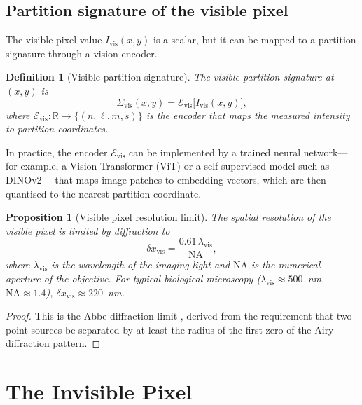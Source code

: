 \documentclass[11pt,twocolumn,a4paper]{article}
\newtheorem{proposition}[theorem]{Proposition}
\newtheorem{definition}{Definition}
\newcommand{\Sigvis}{\Sigma_{\mathrm{vis}}}
\newcommand{\R}{\mathbb{R}}
\begin{document}
\subsection{Partition signature of the visible pixel}

The visible pixel value $I_{\mathrm{vis}}(x,y)$ is a scalar, but it can be mapped to a partition signature through a vision encoder.

\begin{definition}[Visible partition signature]\label{def:vissig}
The visible partition signature at $(x,y)$ is
\begin{equation}\label{eq:vissig}
\Sigvis(x,y) = \mathcal{E}_{\mathrm{vis}}\bigl[I_{\mathrm{vis}}(x,y)\bigr],
\end{equation}
where $\mathcal{E}_{\mathrm{vis}}: \R \to \{(n,\ell,m,s)\}$ is the encoder that maps the measured intensity to partition coordinates.
\end{definition}

In practice, the encoder $\mathcal{E}_{\mathrm{vis}}$ can be implemented by a trained neural network---for example, a Vision Transformer (ViT) \citep{Dosovitskiy2021} or a self-supervised model such as DINOv2 \citep{Oquab2024}---that maps image patches to embedding vectors, which are then quantised to the nearest partition coordinate.

\begin{proposition}[Visible pixel resolution limit]\label{prop:vis_resolution}
The spatial resolution of the visible pixel is limited by diffraction to
\begin{equation}\label{eq:diffraction}
\delta x_{\mathrm{vis}} = \frac{0.61\,\lambda_{\mathrm{vis}}}{\mathrm{NA}},
\end{equation}
where $\lambda_{\mathrm{vis}}$ is the wavelength of the imaging light and $\mathrm{NA}$ is the numerical aperture of the objective.
For typical biological microscopy ($\lambda_{\mathrm{vis}} \approx 500$~nm, $\mathrm{NA} \approx 1.4$), $\delta x_{\mathrm{vis}} \approx 220$~nm.
\end{proposition}
\begin{proof}
This is the Abbe diffraction limit \citep{Abbe1873,Born1999}, derived from the requirement that two point sources be separated by at least the radius of the first zero of the Airy diffraction pattern.
\end{proof}


\section{The Invisible Pixel}\label{sec:invisible}
\end{document}
